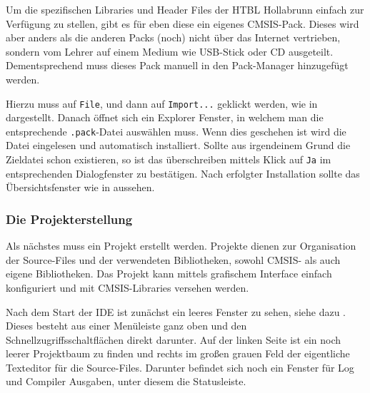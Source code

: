 
\label{sec:tut-firstproject2.1}
Um die spezifischen Libraries und Header Files der HTBL Hollabrunn einfach zur Verfügung zu stellen, gibt es für eben diese ein eigenes \gls{CMSIS}-Pack. Dieses wird aber anders als die anderen Packs (noch) nicht über das Internet vertrieben, sondern vom Lehrer auf einem Medium wie USB-Stick oder CD ausgeteilt. Dementsprechend muss dieses Pack manuell in den Pack-Manager hinzugefügt werden.


Hierzu muss auf \texttt{File}, und dann auf \texttt{Import...} geklickt werden, wie in  dargestellt. Danach öffnet sich ein Explorer Fenster, in welchem man die entsprechende \texttt{.pack}-Datei auswählen muss. Wenn dies geschehen ist wird die Datei eingelesen und automatisch installiert. Sollte aus irgendeinem Grund die Zieldatei schon existieren, so ist das überschreiben mittels Klick auf \texttt{Ja} im entsprechenden Dialogfenster zu bestätigen. Nach erfolgter Installation sollte das Übersichtsfenster wie in  aussehen.


\subsubsection{Die Projekterstellung}
\label{sec:tut-firstproject3}
Als nächstes muss ein \uVision{} Projekt erstellt werden. Projekte dienen zur Organisation der Source-Files und der verwendeten Bibliotheken, sowohl \gls{CMSIS}- als auch eigene Bibliotheken. Das Projekt kann mittels grafischem Interface einfach konfiguriert und mit \gls{CMSIS}-Libraries versehen werden.


Nach dem Start der \gls{IDE} ist zunächst ein leeres Fenster zu sehen, siehe dazu . Dieses besteht aus einer Menüleiste ganz oben und den Schnellzugriffsschaltflächen direkt darunter. Auf der linken Seite ist ein noch leerer Projektbaum zu finden und rechts im großen grauen Feld der eigentliche Texteditor für die Source-Files. Darunter befindet sich noch ein Fenster für Log und Compiler Ausgaben, unter diesem die Statusleiste.

